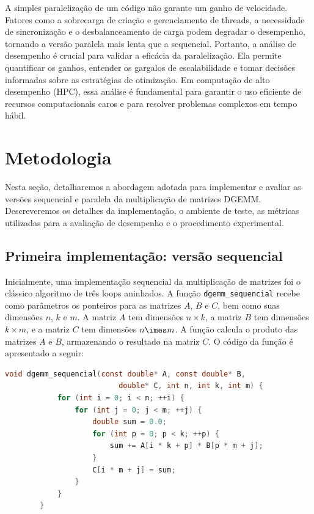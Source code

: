 \documentclass[12pt, a4paper]{article}
\begin{document}
	A simples paralelização de um código não garante um ganho de velocidade. Fatores como a sobrecarga de criação e gerenciamento de threads, a necessidade de sincronização e o desbalanceamento de carga podem degradar o desempenho, tornando a versão paralela mais lenta que a sequencial. Portanto, a análise de desempenho é crucial para validar a eficácia da paralelização. Ela permite quantificar os ganhos, entender os gargalos de escalabilidade e tomar decisões informadas sobre as estratégias de otimização. Em computação de alto desempenho (HPC), essa análise é fundamental para garantir o uso eficiente de recursos computacionais caros e para resolver problemas complexos em tempo hábil.

	\newpage
	\section{Metodologia}

	Nesta seção, detalharemos a abordagem adotada para implementar e avaliar as versões sequencial e paralela da multiplicação de matrizes DGEMM. Descreveremos os detalhes da implementação, o ambiente de teste, as métricas utilizadas para a avaliação de desempenho e o procedimento experimental.

	\subsection{Primeira implementação: versão sequencial}

	Inicialmente, uma implementação sequencial da multiplicação de matrizes foi o clássico algoritmo de três loops aninhados. A função \texttt{dgemm\_sequencial} recebe como parâmetros os ponteiros para as matrizes $A$, $B$ e $C$, bem como suas dimensões $n$, $k$ e $m$. A matriz $A$ tem dimensões $n \times k$, a matriz $B$ tem dimensões $k \times m$, e a matriz $C$ tem dimensões $n \imes m$. A função calcula o produto das matrizes $A$ e $B$, armazenando o resultado na matriz $C$. O código da função é apresentado a seguir:

	\begin{lstlisting}[language=C]
		void dgemm_sequencial(const double* A, const double* B, 
                          double* C, int n, int k, int m) {
            for (int i = 0; i < n; ++i) {
                for (int j = 0; j < m; ++j) {
                    double sum = 0.0;
                    for (int p = 0; p < k; ++p) {
                        sum += A[i * k + p] * B[p * m + j];
                    }
                    C[i * m + j] = sum;
                }
            }
        }
	\end{lstlisting}
\end{document}
